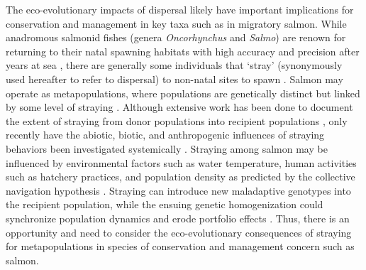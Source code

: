 \documentclass{revtex4}
\begin{document}
The eco-evolutionary impacts of dispersal likely have important implications for conservation and management in key taxa such as in migratory salmon.
While anadromous salmonid fishes (genera \emph{Oncorhynchus} and \emph{Salmo}) are renown for returning to their natal spawning habitats with high accuracy and precision after years at sea \citep{Quinn:2011tf,Jonsson:2011kg,Keefer:2014gg}, there are generally some individuals that `stray' (synonymously used hereafter to refer to dispersal) to non-natal sites to spawn \citep{Quinn:1993ge,Hendry:2004wf}.
Salmon may operate as metapopulations, where populations are genetically distinct but linked by some level of straying \citep{Schtickzelle:2007wb,Anderson:2014cx}.
Although extensive work has been done to document the extent of straying from donor populations into recipient populations \citep{Keefer:2014gg,Bett:2017ha}, only recently have the abiotic, biotic, and anthropogenic influences of straying behaviors been investigated systemically \citep{Keefer:2008bs,Westley:2015to,Bond:2016dz}.
Straying among salmon may be influenced by environmental factors such as water temperature, human activities such as hatchery practices, and population density as predicted by the collective navigation hypothesis \citep{Peterson:2014gy,Berdahl:2017uu}.
Straying can introduce new maladaptive genotypes into the recipient population, while the ensuing genetic homogenization could synchronize population dynamics and erode portfolio effects \citep{Moore:2010gs,Carlson:2011ce,Braun:2016ib}.
Thus, there is an opportunity and need to consider the eco-evolutionary consequences of straying for metapopulations in species of conservation and management concern such as salmon. 

\end{document}
